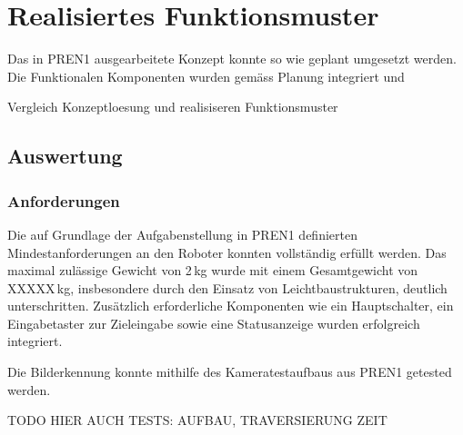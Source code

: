 \section{Realisiertes Funktionsmuster}

Das in PREN1 ausgearbeitete Konzept konnte so wie geplant umgesetzt werden. Die Funktionalen Komponenten wurden gemäss Planung integriert und 

Vergleich  Konzeptloesung und realisiseren Funktionsmuster



\subsection{Auswertung}

\subsubsection{Anforderungen}
Die auf Grundlage der Aufgabenstellung in PREN1 definierten Mindestanforderungen an den Roboter konnten vollständig erfüllt werden. Das maximal zulässige Gewicht von 2 kg wurde mit einem Gesamtgewicht von XXXXX kg, insbesondere durch den Einsatz von Leichtbaustrukturen, deutlich unterschritten. Zusätzlich erforderliche Komponenten wie ein Hauptschalter, ein Eingabetaster zur Zieleingabe sowie eine Statusanzeige wurden erfolgreich integriert.

Die Bilderkennung konnte mithilfe des Kameratestaufbaus aus PREN1 getested werden. 

TODO HIER AUCH TESTS: AUFBAU, TRAVERSIERUNG ZEIT